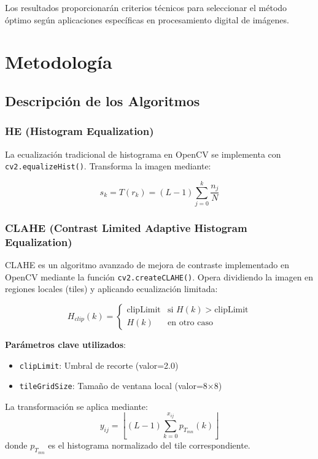\documentclass[sigchi]{acmart}
\begin{document}
Los resultados proporcionarán criterios técnicos para seleccionar el método óptimo según
aplicaciones específicas en procesamiento digital de imágenes.

\section{Metodología}
\label{sec:metodologia}
\subsection{Descripción de los Algoritmos}
\label{subsec:algoritmos}

\subsubsection{HE (Histogram Equalization)}
\label{sssec:he}
La ecualización tradicional de histograma en OpenCV se implementa con
\texttt{cv2.equalizeHist()}. Transforma la imagen mediante:

\begin{equation}
	s_k = T(r_k) = (L-1)\sum_{j=0}^k \frac{n_j}{N}
\end{equation}

\subsubsection{CLAHE (Contrast Limited Adaptive Histogram Equalization)}
\label{sssec:clahe}
CLAHE es un algoritmo avanzado de mejora de contraste implementado en OpenCV mediante la
función \texttt{cv2.createCLAHE()}. Opera dividiendo la imagen en regiones locales (tiles) y
aplicando ecualización limitada:

\begin{equation}
	H_{clip}(k) =
	\begin{cases}
		\text{clipLimit} & \text{si } H(k) > \text{clipLimit} \\
		H(k)             & \text{en otro caso}
	\end{cases}
\end{equation}

\textbf{Parámetros clave utilizados}:
\begin{itemize}
	\item \texttt{clipLimit}: Umbral de recorte (valor=2.0)
	\item \texttt{tileGridSize}: Tamaño de ventana local (valor=8×8)
\end{itemize}

La transformación se aplica mediante:
\begin{equation}
	y_{ij} = \left\lfloor (L-1) \sum_{k=0}^{x_{ij}} p_{T_{mn}}(k) \right\rfloor
\end{equation}
donde $p_{T_{mn}}$ es el histograma normalizado del tile correspondiente.
\end{document}
